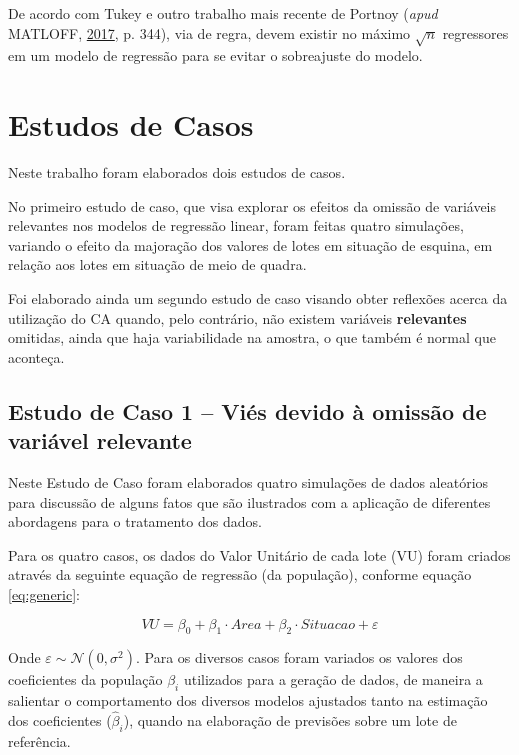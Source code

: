 \documentclass[
  a4paper, 11pt]{article}
\begin{document}
De acordo com Tukey e outro trabalho mais recente de Portnoy
(\emph{apud} MATLOFF, \protect\hyperlink{ref-matloff2017}{2017}, p.
344), via de regra, devem existir no máximo \(\sqrt{n}\) regressores em
um modelo de regressão para se evitar o sobreajuste do modelo.

\hypertarget{estudos-de-casos}{%
\section{Estudos de Casos}\label{estudos-de-casos}}

Neste trabalho foram elaborados dois estudos de casos.

No primeiro estudo de caso, que visa explorar os efeitos da omissão de
variáveis relevantes nos modelos de regressão linear, foram feitas
quatro simulações, variando o efeito da majoração dos valores de lotes
em situação de esquina, em relação aos lotes em situação de meio de
quadra.

Foi elaborado ainda um segundo estudo de caso visando obter reflexões
acerca da utilização do CA quando, pelo contrário, não existem variáveis
\textbf{relevantes} omitidas, ainda que haja variabilidade na amostra, o
que também é normal que aconteça.

\hypertarget{estudo-de-caso-1-viuxe9s-devido-uxe0-omissuxe3o-de-variuxe1vel-relevante}{%
\subsection{Estudo de Caso 1 -- Viés devido à omissão de variável
relevante}\label{estudo-de-caso-1-viuxe9s-devido-uxe0-omissuxe3o-de-variuxe1vel-relevante}}

Neste Estudo de Caso foram elaborados quatro simulações de dados
aleatórios para discussão de alguns fatos que são ilustrados com a
aplicação de diferentes abordagens para o tratamento dos dados.

Para os quatro casos, os dados do Valor Unitário de cada lote (VU) foram
criados através da seguinte equação de regressão (da população),
conforme equação \ref{eq:generic}:

\begin{equation} \label{eq:generic}
VU = \beta_0 + \beta_1 \cdot Area + \beta_2 \cdot Situacao + \varepsilon
\end{equation}

Onde \(\varepsilon \sim \mathcal{N}(0, \sigma^2)\). Para os diversos
casos foram variados os valores dos coeficientes da população
\(\beta_i\) utilizados para a geração de dados, de maneira a salientar o
comportamento dos diversos modelos ajustados tanto na estimação dos
coeficientes (\(\hat\beta_i\)), quando na elaboração de previsões sobre
um lote de referência.
\end{document}
